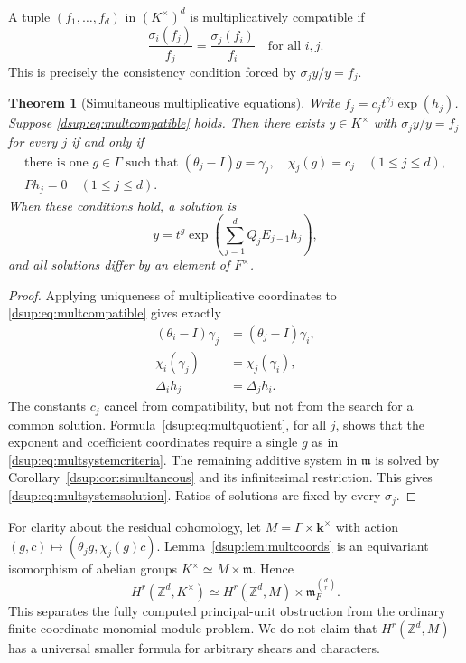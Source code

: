 \documentclass[11pt,oneside]{article}
\numberwithin{equation}{section}
\newtheorem{theorem}{Theorem}[section]
\theoremstyle{definition}
\theoremstyle{remark}
\newcommand{\Z}{\mathbb Z}
\newcommand{\kk}{\mathbf k}
\newcommand{\mm}{\mathfrak m}
\begin{document}
A tuple $(f_1,\ldots,f_d)$ in $(K^\times)^d$ is multiplicatively
compatible if
\begin{equation}\label{dsup:eq:multcompatible}
 \frac{\sigma_i(f_j)}{f_j}=\frac{\sigma_j(f_i)}{f_i}
 \quad\text{for all }i,j.
\end{equation}
This is precisely the consistency condition forced by
$\sigma_jy/y=f_j$.

\begin{theorem}[Simultaneous multiplicative equations]\label{dsup:thm:multsystem}
Write $f_j=c_jt^{\gamma_j}\exp(h_j)$. Suppose
\eqref{dsup:eq:multcompatible} holds. Then there exists $y\in K^\times$ with
$\sigma_jy/y=f_j$ for every $j$ if and only if
\begin{equation}\label{dsup:eq:multsystemcriteria}
 \begin{gathered}
 \text{there is one }g\in\Gamma\text{ such that }
    (\theta_j-I)g=\gamma_j,\quad \chi_j(g)=c_j\quad(1\le j\le d),\\
 Ph_j=0\quad(1\le j\le d).
 \end{gathered}
\end{equation}
When these conditions hold, a solution is
\begin{equation}\label{dsup:eq:multsystemsolution}
 y=t^g\exp\left(\sum_{j=1}^d Q_jE_{j-1}h_j\right),
\end{equation}
and all solutions differ by an element of $F^\times$.
\end{theorem}
\begin{proof}
Applying uniqueness of multiplicative coordinates to
\eqref{dsup:eq:multcompatible} gives exactly
\begin{align*}
 (\theta_i-I)\gamma_j&=(\theta_j-I)\gamma_i,\\
 \chi_i(\gamma_j)&=\chi_j(\gamma_i),\\
 \Delta_i h_j&=\Delta_j h_i.
\end{align*}
The constants $c_j$ cancel from compatibility, but not from the search
for a common solution. Formula~\eqref{dsup:eq:multquotient}, for all $j$, shows
that the exponent and coefficient coordinates require a single $g$ as
in \eqref{dsup:eq:multsystemcriteria}. The remaining additive system in
$\mm$ is solved by Corollary~\ref{dsup:cor:simultaneous} and its infinitesimal
restriction. This gives \eqref{dsup:eq:multsystemsolution}. Ratios of solutions
are fixed by every $\sigma_j$.
\end{proof}

For clarity about the residual cohomology, let
$M=\Gamma\times\kk^\times$ with action
$(g,c)\mapsto(\theta_jg,\chi_j(g)c)$. Lemma~\ref{dsup:lem:multcoords} is an
equivariant isomorphism of abelian groups $K^\times\simeq M\times\mm$.
Hence
\begin{equation}\label{dsup:eq:allmultcohom}
 H^r(\Z^d,K^\times)
 \simeq H^r(\Z^d,M)\times\mm_F^{\binom dr}.
\end{equation}
This separates the fully computed principal-unit obstruction from the
ordinary finite-coordinate monomial-module problem. We do not claim that
$H^r(\Z^d,M)$ has a universal smaller formula for arbitrary shears and
characters.
\end{document}
